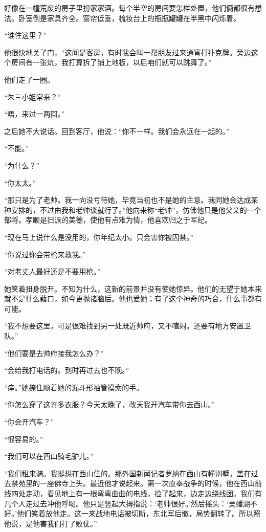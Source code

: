 \par 好像在一幢荒废的房子里扮家家酒。每个半空的房间要怎样处置，他们俩都很有想法。卧室倒是家具齐全。窗帘低垂，梳妆台上的瓶瓶罐罐在半黑中闪烁着。
\par “谁住这里？”
\par 他很快地关了门，“这间是客房，有时我会叫一帮朋友过来通宵打扑克牌。旁边这个房间有一张炕，我打算拆了铺上地板，以后咱们就可以跳舞了。”
\par 他们走了一圈。
\par “朱三小姐常来？”
\par “唔，来过一两回。”
\par 之后她不大说话。回到客厅，他说：“你不一样。我们会永远在一起的。”
\par “不能。”
\par “为什么？”
\par “你太太。”
\par “那只是为了老帅。我一向没亏待她，毕竟当初也不是她的主意。我同她会达成某种安排的，不过由我和老帅谈就行了。”他向来称“老帅”，仿佛他只是他父亲的一个部将。孝顺是旧派的美德，使他有点难为情，他喜欢归之于军纪。
\par “现在马上说什么是没用的，你年纪太小。只会害你被囚禁。”
\par “你说过你会带枪来救我。”
\par “对老丈人最好还是不要用枪。”
\par 她笑着扭身脱开。不知为什么，这新的前景并没有使她惊异。他们的无望于她本来就不是什么藉口，如今更抛诸脑后。他也爱她；有了这个神奇的巧合，什么事都有可能。
\par “我不想要这里，可是很难找到另一处既近帅府，又不喧闹。还要有地方安置卫队。”
\par “他们要是去帅府接我怎么办？”
\par “会给我打电话的。到时再过去也不晚。”
\par “痒。”她捺住顺着她的漏斗形袖管摸索的手。
\par “你怎么穿了这许多衣服？今天太晚了，改天我开汽车带你去西山。”
\par “你会开汽车？”
\par “很容易的。”
\par “我们可以在西山骑毛驴儿。”
\par “我们租来骑。我挺想在西山住的。那外国新闻记者罗纳在西山有幢别墅，盖在过去禁苑里的一座佛寺上头。最近他才说起来。第一次直奉战争的时候，他在西山前线四处走动，看见地上有一根弯弯曲曲的电线，捡了起来，边走边绕线团。我们有几个人走过去冲他呼喝。他只是竖起大拇指说：‘老帅很好。’然后摇头：‘吴蟠湖不好。’他们笑着放他走。这一来战地电话被切断，东北军后撤，局势翻转了。所以照他说，是他害我们打了败仗。”

